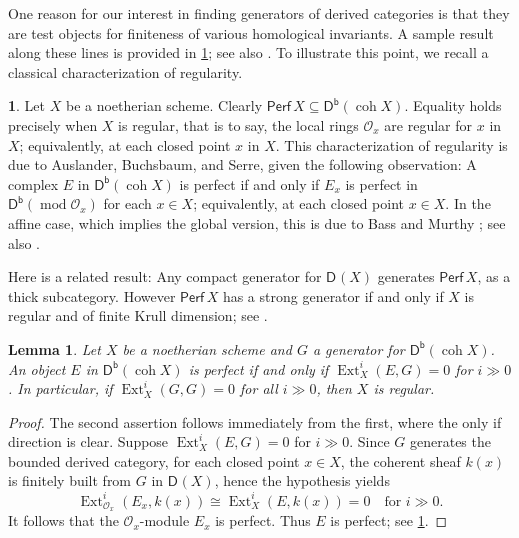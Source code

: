 \documentclass{amsart}
\newcommand{\dcat}[2][]{\cat{D}_{#1}(#2)}
\newcommand{\perf}[1]{\mathsf{Perf}\,#1}
\newcommand{\coh}{\operatorname{coh}}
\newcommand{\dbcat}[1]{\cat{D}^{\mathsf{b}}(#1)}
\newcommand{\mco}{\mathcal{O}}
\newcommand{\cat}[1]{{\mathsf{#1}}}
\newcommand{\Ext}{\operatorname{Ext}}
\newcommand{\rmod}{\operatorname{mod}}
\newtheorem{lemma}[subsection]{Lemma}
\theoremstyle{definition}
\newtheorem{chunk}[subsection]{}
\theoremstyle{remark}
\numberwithin{equation}{subsection}
\begin{document}
One reason for our interest in finding generators of derived categories is that they are test objects for finiteness of various homological invariants. A sample result along these lines is provided in \cref{le:sample}; see also \cite{Dwyer/Greenlees/Iyengar:2006b}. To illustrate this point, we recall a classical characterization of regularity.

\begin{chunk}
\label{ch:regular}
Let $X$ be a noetherian scheme. Clearly $\perf X\subseteq \dbcat{\coh X}$. Equality holds precisely when $X$ is regular, that is to say, the local rings $\mco_{x}$ are regular for $x$ in $X$; equivalently, at each closed point $x$ in $X$. This characterization of regularity is  due to Auslander, Buchsbaum, and Serre, given the following observation: A complex $E$ in $\dbcat{\coh X}$ is perfect if and only if $E_x$ is perfect in $\dbcat{\rmod \mco_x}$ for each $x\in X$; equivalently, at each closed point $x\in X$. In the affine case, which implies the global version, this is due to Bass and Murthy \cite{Bass/Murthy:1967}; see also \cite[Theorem~4.1]{Avramov/Iyengar/Lipman:2010}.
 
Here is a related result: Any compact generator for $\dcat X$ generates $\perf X$, as a thick subcategory. However $\perf X$ has a strong generator if and only if $X$ is regular and of finite Krull dimension; see \cite[Proposition~7.25]{Rouquier:2008}.
\end{chunk}

\begin{lemma}
\label{le:sample}
Let $X$ be a noetherian scheme and $G$ a generator for $\dbcat{\coh X}$. An object $E$ in $\dbcat{\coh X}$ is perfect if and only if $\Ext_X^i(E,G)=0$ for $i\gg 0$. In particular, if $\Ext_X^i(G,G)=0$ for all $i\gg 0$, then $X$ is regular. 
\end{lemma}

\begin{proof}
The second assertion follows immediately from the first, where the only if direction is clear. Suppose $\Ext_X^i(E,G)=0$ for $i\gg 0$. Since $G$ generates the bounded derived category, for each closed point $x\in X$, the coherent sheaf $k(x)$ is finitely built from $G$ in $\dcat X$, hence the hypothesis yields
\[
\Ext^i_{\mco_x}(E_x,k(x)) \cong \Ext^i_{X}(E,k(x)) =0 \quad \text{for $i\gg 0$.}
\]
It follows that the $\mco_x$-module $E_x$ is perfect. Thus $E$ is perfect; see \cref{ch:regular}.
\end{proof}

\end{document}
